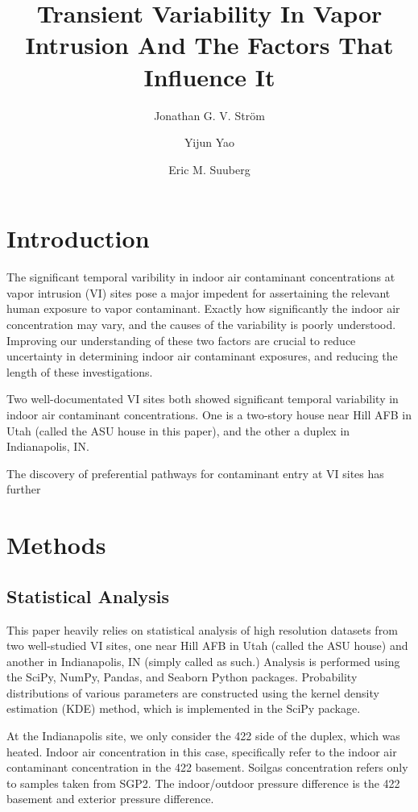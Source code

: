 \documentclass[journal=esthag,manuscript=article]{achemso}
\author{Jonathan G. V. Ström}
\affiliation[Brown University]{Brown University, School of Engineering, Providence, RI, USA}
\author{Yijun Yao}
\affiliation[Zhejiang University]{Zhejiang University, Hangzhou, China}
\author{Eric M. Suuberg}
\affiliation[Brown University]{Brown University, School of Engineering, Providence, RI, USA}
\title{Transient Variability In Vapor Intrusion And The Factors That Influence It}
\begin{document}
\begin{abstract}

\end{abstract}

\section{Introduction}

The significant temporal varibility in indoor air contaminant concentrations at vapor intrusion (VI) sites pose a major impedent for assertaining the relevant human exposure to vapor contaminant.
Exactly how significantly the indoor air concentration may vary, and the causes of the variability is poorly understood.
Improving our understanding of these two factors are crucial to reduce uncertainty in determining indoor air contaminant exposures, and reducing the length of these investigations.


Two well-documentated VI sites both showed significant temporal variability in indoor air contaminant concentrations.
One is a two-story house near Hill AFB in Utah (called the ASU house in this paper), and the other a duplex in Indianapolis, IN.

The discovery of preferential pathways for contaminant entry at VI sites has further

\section{Methods}

\subsection{Statistical Analysis}

This paper heavily relies on statistical analysis of high resolution datasets from two well-studied VI sites, one near Hill AFB in Utah (called the ASU house) and another in Indianapolis, IN (simply called as such.)
Analysis is performed using the SciPy, NumPy, Pandas, and Seaborn Python packages.
Probability distributions of various parameters are constructed using the kernel density estimation (KDE) method\cite{altman_introduction_1992}, which is implemented in the SciPy package.

At the Indianapolis site, we only consider the 422 side of the duplex, which was heated.
Indoor air concentration in this case, specifically refer to the indoor air contaminant concentration in the 422 basement.
Soilgas concentration refers only to samples taken from SGP2.
The indoor/outdoor pressure difference is the 422 basement and exterior pressure difference.  
\end{document}
